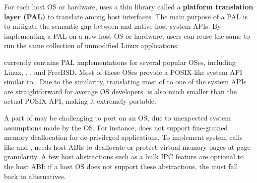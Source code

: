 For each host OS or hardware, \graphene{} uses
a thin library called a {\bf platform translation layer (PAL)}
to translate among host interfaces.
The main purpose of a PAL is to mitigate the semantic gap
between \thehostabi{} and
native host system APIs.
By implementing a PAL on a new host OS or hardware,
users can reuse
the same \libos{} to run the same collection of unmodified Linux applications.







\graphene{} currently contains PAL implementations for several popular OSes,
including Linux, \win{}, \osx{}, and FreeBSD.
Most of these OSes provide a POSIX-like system API similar to \thehostabi{}.
Due to the similarity, translating most of \thehostabi{} to one of the system APIs
are straightforward for average OS developers.
\Thehostabi{} is also much smaller than the actual POSIX API, making it extremely portable.



A part of \thehostabi{} may be challenging to port
on an OS,
due to unexpected system assumptions made by the OS.
For instance, \win{} does not support
fine-grained memory deallocation for de-privileged applications.
To implement system calls like  and ,
\graphene{} needs host ABIs to
deallocate or protect virtual memory pages at page granularity.
A few host abstractions such as a bulk IPC feature are
optional to the host ABI;
if a host OS does not support these abstractions,
the \libos{} must fall back to alternatives. 

